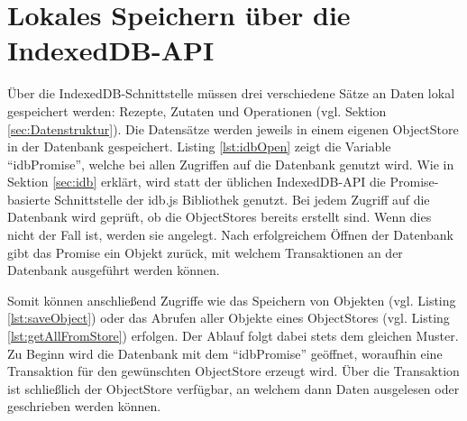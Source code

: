 \documentclass[a4paper, 12pt]{scrreprt}
\begin{document}
\begin{minipage}{\linewidth}
	
\end{minipage}

\begin{minipage}{\linewidth}
	
\end{minipage}

\section{Lokales Speichern über die IndexedDB-API}
\label{sec:lokalesIndexeddb}

Über die IndexedDB-Schnittstelle müssen drei verschiedene Sätze an Daten lokal gespeichert werden: Rezepte, Zutaten und Operationen (vgl. Sektion \ref{sec:Datenstruktur}). Die Datensätze werden jeweils in einem eigenen ObjectStore in der Datenbank gespeichert. Listing \ref{lst:idbOpen} zeigt die Variable \enquote{idbPromise}, welche bei allen Zugriffen auf die Datenbank genutzt wird. Wie in Sektion \ref{sec:idb} erklärt, wird statt der üblichen IndexedDB-API die Promise-basierte Schnittstelle der idb.js Bibliothek genutzt. Bei jedem Zugriff auf die Datenbank wird geprüft, ob die ObjectStores bereits erstellt sind. Wenn dies nicht der Fall ist, werden sie angelegt. Nach erfolgreichem Öffnen der Datenbank gibt das Promise ein Objekt zurück, mit welchem Transaktionen an der Datenbank ausgeführt werden können.

\begin{minipage}{\linewidth}
	
\end{minipage}

Somit können anschließend Zugriffe wie das Speichern von Objekten (vgl. Listing \ref{lst:saveObject}) oder das Abrufen aller Objekte eines ObjectStores (vgl. Listing \ref{lst:getAllFromStore}) erfolgen. Der Ablauf folgt dabei stets dem gleichen Muster. Zu Beginn wird die Datenbank mit dem \enquote{idbPromise} geöffnet, woraufhin eine Transaktion für den gewünschten ObjectStore erzeugt wird. Über die Transaktion ist schließlich der ObjectStore verfügbar, an welchem dann Daten ausgelesen oder geschrieben werden können.

\begin{minipage}{\linewidth}
	
\end{minipage}
\end{document}
